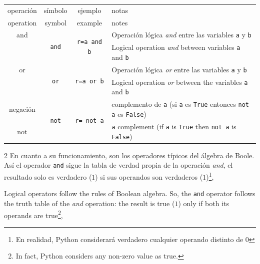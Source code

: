 \begin{table}[h]
\label{tablo1}
\centering
\begin{tabular}{cccm{7cm}}
\hline
\hline
operación&símbolo&ejemplo&notas\\
operation&symbol&example&notes\\
\hline
and&\multirow{2}{*}{\texttt{and}}&\multirow{2}{*}{\texttt{r=a and b}}&Operación lógica \emph{and} entre las variables \texttt{a} y \texttt{b} \\
&&& Logical operation \emph{and} between variables \texttt{a} and \texttt{b}\\
\hline
or &\multirow{2}{*}{\texttt{or}}&\multirow{2}{*}{\texttt{r=a or b}}& Operación lógica \emph{or} entre las variables \texttt{a} y \texttt{b}\\
&&& Logical operation \emph{or} between the variables \texttt{a} and \texttt{b}\\
\hline
negación&\multirow{2}{*}{\texttt{not}}&\multirow{2}{*}{\texttt{r= not a}}&complemento de \texttt{a} (si \texttt{a} es \texttt{True} entonces \texttt{not a} es \texttt{False})\\
not &&& \texttt{a} complement (if \texttt{a} is \texttt{True} then \texttt{not a} is \texttt{False})\\
\hline
\hline
\end{tabular}
\end{table} 

\begin{paracol}{2}
En cuanto a su funcionamiento, son los operadores típicos del álgebra de Boole. Así el operador \texttt{and} sigue la tabla de verdad propia de la operación \emph{and}, el resultado solo es verdadero ($1$) si sus operandos son verdaderos ($1$)\footnote{En realidad, Python considerará verdadero cualquier operando distinto de $0$},

\switchcolumn
Logical operators follow the rules of Boolean algebra. So, the \texttt{and} operator follows the truth table of the \emph{and} operation: the result is true ($1$) only if both its operands are true\footnote{In fact, Python considers any non-zero value as true.},     
\end{paracol}

